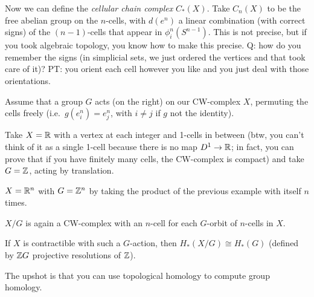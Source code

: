 Now we can define the \emph{cellular chain complex} $C_*(X)$. Take $C_n(X)$ to be the free abelian group on the $n$-cells, with $d(e^n)$ a linear combination (with correct signs) of the $(n-1)$-cells that appear in $\phi_i^n(S^{n-1})$. This is not precise, but if you took algebraic topology, you know how to make this precise. Q: how do you remember the signs (in simplicial sets, we just ordered the vertices and that took care of it)? PT: you orient each cell however you like and you just deal with those orientations.

Assume that a group $G$ acts (on the right) on our CW-complex $X$, permuting the cells freely (i.e.~$g(e^n_i)=e^n_j$, with $i\neq j$ if $g$ not the identity). 
\begin{example}
 Take $X=\mathbb{R}$ with a vertex at each integer and 1-cells in between (btw, you can't think of it as a single 1-cell because there is no map $D^1\to \mathbb{R}$; in fact, you can prove that if you have finitely many cells, the CW-complex is compact) and take $G=\mathbb{Z}$, acting by translation. 
\end{example}
\begin{example}
 $X=\mathbb{R}^n$ with $G=\mathbb{Z}^n$ by taking the product of the previous example with itself $n$ times.
\end{example}
\begin{lemma}
 $X/G$ is again a CW-complex with an $n$-cell for each $G$-orbit of $n$-cells in $X$.
\end{lemma}
\begin{theorem}
 If $X$ is contractible with such a $G$-action, then $H_*(X/G)\cong H_*(G)$ (defined by $\mathbb{Z} G$ projective resolutions of $\mathbb{Z}$).
\end{theorem}
The upshot is that you can use topological homology to compute group homology.









